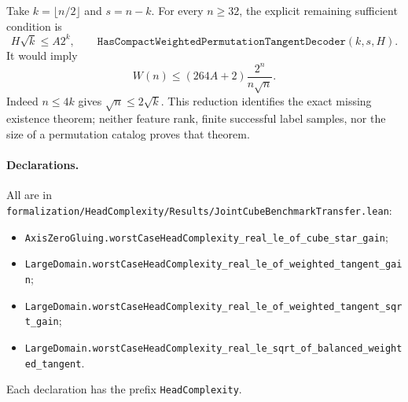 \documentclass[11pt]{article}
\begin{document}
Take $k=\lfloor n/2\rfloor$ and $s=n-k$. For every $n\geq32$, the explicit
remaining sufficient condition is
\[
 H\sqrt{k}\leq A2^k,
 \qquad
 \texttt{HasCompactWeightedPermutationTangentDecoder}(k,s,H).
\]
It would imply
\[
 W(n)\leq(264A+2)\frac{2^n}{n\sqrt n}.
\]
Indeed $n\leq4k$ gives $\sqrt n\leq2\sqrt k$.
This reduction identifies the exact missing existence theorem; neither
feature rank, finite successful label samples, nor the size of a permutation
catalog proves that theorem.

\paragraph{Declarations.}
All are in
\texttt{formalization/HeadComplexity/Results/JointCubeBenchmarkTransfer.lean}:
\begin{itemize}
\item \texttt{AxisZeroGluing.worstCaseHeadComplexity\_real\_le\_of\_cube\_star\_gain};
\item \texttt{LargeDomain.worstCaseHeadComplexity\_real\_le\_of\_weighted\_tangent\_gain};
\item \texttt{LargeDomain.worstCaseHeadComplexity\_real\_le\_of\_weighted\_tangent\_sqrt\_gain};
\item \texttt{LargeDomain.worstCaseHeadComplexity\_real\_le\_sqrt\_of\_balanced\_weighted\_tangent}.
\end{itemize}
Each declaration has the prefix \texttt{HeadComplexity}.
\end{document}
